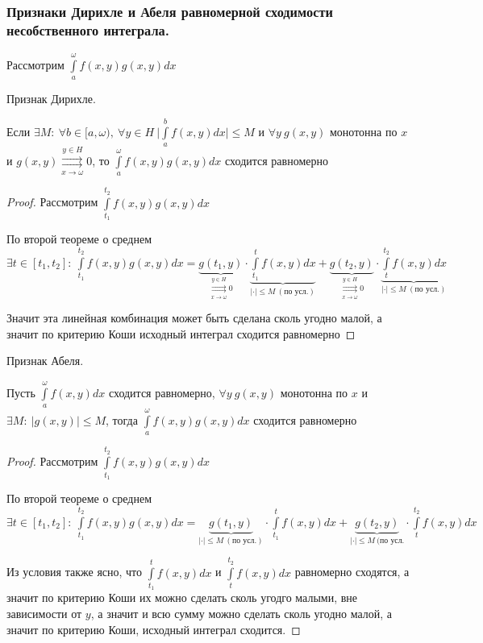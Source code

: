 \subsubsection{Признаки Дирихле и Абеля равномерной сходимости несобственного интеграла.}
Рассмотрим $\int\limits_a^\omega f(x,y)g(x,y)dx$
\begin{theorem*} 
    Признак Дирихле.
    
    Если $\exists M\colon\ \forall b\in[a,\omega),\ \forall y\in H\ \Big|\int\limits_a^bf(x,y)dx\Big|\leqslant M$ и $\forall y\ g(x,y)$ монотонна по $x$ и $g(x,y)\overset{y\in H}{\underset{x\to\omega}{\rightrightarrows}}0$, то 
        $\int\limits_a^\omega f(x,y)g(x,y)dx$ сходится равномерно
\end{theorem*}
\begin{proof} 
    Рассмотрим $\int\limits_{t_1}^{t_2} f(x,y)g(x,y)dx$ 
    
    По второй теореме о среднем $\exists t\in [t_1,t_2]\colon\  \int\limits_{t_1}^{t_2} f(x,y)g(x,y)dx=\underbrace{g(t_1,y)}_{\overset{y\in H}{\underset{x\to\omega}{\rightrightarrows}}0}\cdot \underbrace{\int\limits_{t_1}^{t} f(x,y)dx}_{|\cdot|\leqslant M\ (\text{по усл.})} + \underbrace{g(t_2, y)}_{\overset{y\in H}{\underset{x\to\omega}{\rightrightarrows}}0}\cdot\underbrace{\int\limits_t^{t_2} f(x,y)dx}_{|\cdot|\leqslant M\ (\text{по усл.})}$
    
    Значит эта линейная комбинация может быть сделана сколь угодно малой, а значит по критерию Коши исходный интеграл сходится равномерно
\end{proof}

\begin{theorem*} 
    Признак Абеля.
    
    Пусть $\int\limits_a^\omega f(x,y)dx$ сходится равномерно, $\forall y\ g(x,y)$ монотонна по $x$ и $\exists M\colon\ |g(x,y)|\leqslant M$, тогда 
        $\int\limits_a^\omega f(x,y)g(x,y)dx$ сходится равномерно
\end{theorem*}
\begin{proof}
    Рассмотрим $\int\limits_{t_1}^{t_2} f(x,y)g(x,y)dx$
    
    По второй теореме о среднем $\exists t\in [t_1,t_2]\colon\  \int\limits_{t_1}^{t_2} f(x,y)g(x,y)dx=\underbrace{g(t_1,y)}_{|\cdot|\leqslant M\ (\text{по усл.})}\cdot \int\limits_{t_1}^{t} f(x,y)dx + \underbrace{g(t_2, y)}_{|\cdot|\leqslant M\ (\text{по усл.}}\cdot\int\limits_t^{t_2} f(x,y)dx$
    
    Из условия также ясно, что $\int\limits_{t_1}^{t} f(x,y)dx$ и $\int\limits_t^{t_2} f(x,y)dx$ равномерно сходятся, а значит по критерию Коши их можно сделать сколь угодго малыми, вне зависимости от $y$, а значит и всю сумму можно сделать сколь угодно малой, а значит по критерию Коши, исходный интеграл сходится.
\end{proof}
